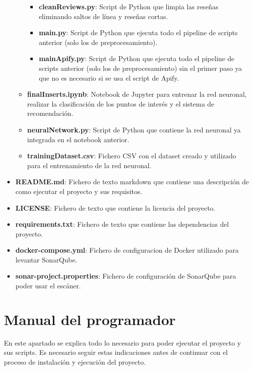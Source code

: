 \begin{itemize}
\begin{itemize}
\begin{itemize}
                    \item \textbf{cleanReviews.py}: Script de Python que limpia las reseñas eliminando saltos de línea y reseñas cortas.
                    \item \textbf{main.py}: Script de Python que ejecuta todo el pipeline de scripts anterior (solo los de preprocesamiento).
                    \item \textbf{mainApify.py}: Script de Python que ejecuta todo el pipeline de scripts anterior (solo los de preprocesamiento) sin el primer paso ya que no es necesario si se usa el script de Apify.
                \end{itemize}
            \item \textbf{finalInserts.ipynb}: Notebook de Jupyter para entrenar la red neuronal, realizar la clasificación de los puntos de interés y el sistema de recomendación.
            \item \textbf{neuralNetwork.py}: Script de Python que contiene la red neuronal ya integrada en el notebook anterior.
            \item \textbf{trainingDataset.csv}: Fichero CSV con el dataset creado y utilizado para el entrenamiento de la red neuronal.
        \end{itemize}
    \item \textbf{README.md}: Fichero de texto markdown que contiene una descripción de como ejecutar el proyecto y sus requisitos.
    \item \textbf{LICENSE}: Fichero de texto que contiene la licencia del proyecto.
    \item \textbf{requirements.txt}: Fichero de texto que contiene las dependencias del proyecto.
    \item \textbf{docker-compose.yml}: Fichero de configuracion de Docker utilizado para levantar SonarQube.
    \item \textbf{sonar-project.properties}: Fichero de configuración de SonarQube para poder usar el escáner.
\end{itemize}

\section{Manual del programador}

En este apartado se explica todo lo necesario para poder ejecutar el proyecto y sus scripts.
Es necesario seguir estas indicaciones antes de continuar con el proceso de instalación y ejecución del proyecto.

